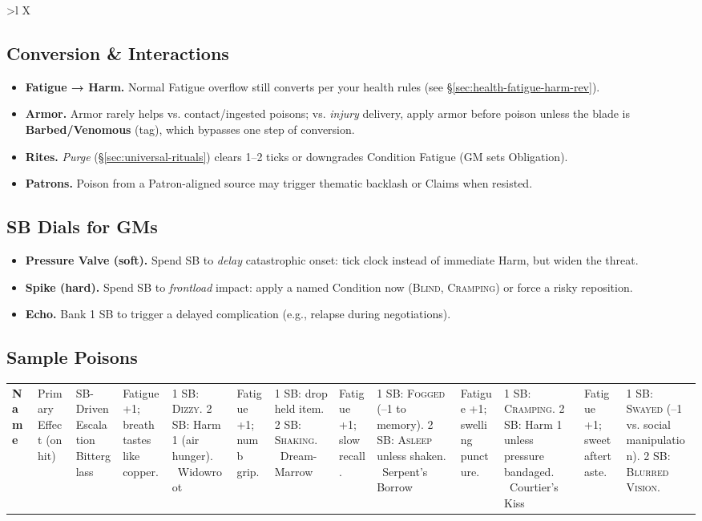 \begin{tabularx}{\linewidth}{>{\bfseries}l X}
\subsection*{Conversion \& Interactions}
\begin{itemize}
\item \textbf{Fatigue → Harm.} Normal Fatigue overflow still converts per your health rules (see \S\ref{sec:health-fatigue-harm-rev}).
\item \textbf{Armor.} Armor rarely helps vs. contact/ingested poisons; vs. \emph{injury} delivery, apply armor before poison unless the blade is \textbf{Barbed/Venomous} (tag), which bypasses one step of conversion.
\item \textbf{Rites.} \emph{Purge} (\S\ref{sec:universal-rituals}) clears 1–2 ticks or downgrades Condition \textrightarrow{} Fatigue (GM sets Obligation).
\item \textbf{Patrons.} Poison from a Patron-aligned source may trigger thematic backlash or Claims when resisted.
\end{itemize}

\subsection*{SB Dials for GMs}
\begin{itemize}
\item \textbf{Pressure Valve (soft).} Spend SB to \emph{delay} catastrophic onset: tick clock instead of immediate Harm, but widen the threat.
\item \textbf{Spike (hard).} Spend SB to \emph{frontload} impact: apply a named Condition now (\textsc{Blind}, \textsc{Cramping}) or force a risky reposition.
\item \textbf{Echo.} Bank 1 SB to trigger a delayed complication (e.g., relapse during negotiations).
\end{itemize}

\subsection*{Sample Poisons}
\begin{tabularx}{\linewidth}{>{\bfseries}l X X}
\toprule
Name & Primary Effect (on hit) & SB-Driven Escalation \
\midrule
Bitterglass & Fatigue +1; breath tastes like copper. & 1 SB: \textsc{Dizzy}. 2 SB: Harm 1 (air hunger). \
Widowroot & Fatigue +1; numb grip. & 1 SB: drop held item. 2 SB: \textsc{Shaking}. \
Dream-Marrow & Fatigue +1; slow recall. & 1 SB: \textsc{Fogged} (–1 to memory). 2 SB: \textsc{Asleep} unless shaken. \
Serpent’s Borrow & Fatigue +1; swelling puncture. & 1 SB: \textsc{Cramping}. 2 SB: Harm 1 unless pressure bandaged. \
Courtier’s Kiss & Fatigue +1; sweet aftertaste. & 1 SB: \textsc{Swayed} (–1 vs. social manipulation). 2 SB: \textsc{Blurred Vision}. \
\bottomrule
\end{tabularx}


\end{tabularx}
